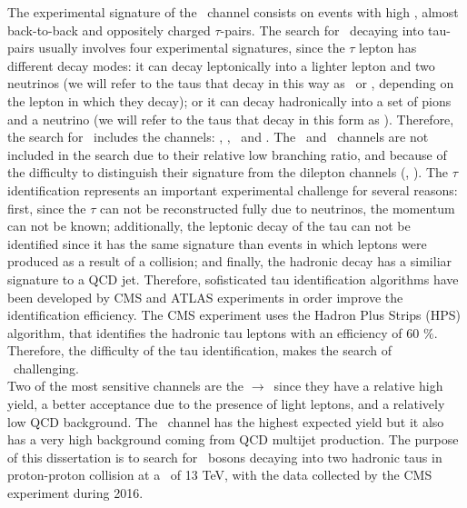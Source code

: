 The experimental signature of the \Zprimetotautau~channel consists on events with high \pt, almost
back-to-back and oppositely charged $\tau$-pairs. The search for \Zprime~decaying into tau-pairs 
usually involves four experimental signatures, since the $\tau$ lepton has different decay modes: it 
can decay leptonically into a lighter lepton and two neutrinos (we will refer to the taus that decay in 
this way as \taue~or \taumu, depending on the lepton in which they decay); 
or it can decay hadronically into a set of pions and a neutrino (we will refer to the taus that decay in this form
as \tauh). Therefore, the search for \Zprimetotautau~includes 
the channels: \taue\tauh, \taumu\tauh, \taue\taumu~and \tauh\tauh. The \taue\taue~and \taumu\taumu~channels
are not included in the search due to their relative low branching ratio, and because of the difficulty to
distinguish their signature from the dilepton channels (\Zprimetomumu, \Zprimetoee). The $\tau$ 
identification represents an important experimental challenge for several reasons: first, since 
the $\tau$ can not be reconstructed fully due to neutrinos, the momentum can not be known; additionally, the leptonic decay of 
the tau can not be identified since it has the same signature than events in which leptons were produced as a result of 
a collision; and finally, the hadronic decay has a similiar signature to a QCD jet. Therefore, sofisticated tau 
identification algorithms have been developed by CMS and ATLAS experiments in order improve the identification 
efficiency. The CMS experiment uses the Hadron Plus Strips (HPS) algorithm, that 
identifies the hadronic tau leptons with an efficiency of 60 $\%$. Therefore, the difficulty of the tau 
identification, makes the search of \Zprimetotautau~challenging. \\

Two of the most sensitive channels are the \Zprime$\rightarrow$\tauell\tauh~since they have 
a relative high yield, a better acceptance due to the presence of light leptons, and a relatively
low QCD background. The \Zprimetotauh~channel has the highest 
expected yield but it also has a very high background coming 
from QCD multijet production. The purpose of this dissertation is to search for \Zprime~bosons decaying into two hadronic taus 
in proton-proton collision at a \centermassenergy~of 13 TeV, with the data collected by the 
CMS  experiment during 2016. \\


